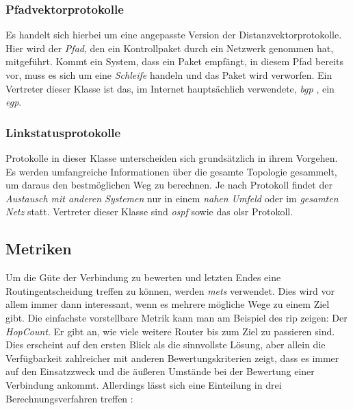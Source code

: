 \subsubsection{Pfadvektorprotokolle}

Es handelt sich hierbei um eine angepasste Version der Distanzvektorprotokolle. Hier wird der \textit{Pfad}, den ein Kontrollpaket durch ein Netzwerk genommen hat, mitgeführt. Kommt ein System, dass ein Paket empfängt, in diesem Pfad bereits vor, muss es sich um eine \textit{Schleife} handeln und das Paket wird verworfen. Ein Vertreter dieser Klasse ist das, im Internet hauptsächlich verwendete, \textit{\gls{bgp}} \cite{RFC1771}, ein \sog \textit{\gls{egp}}.

\subsubsection{Linkstatusprotokolle}

Protokolle in dieser Klasse unterscheiden sich grundsätzlich in ihrem Vorgehen. Es werden umfangreiche Informationen über die gesamte Topologie gesammelt, um daraus den bestmöglichen Weg zu berechnen. Je nach Protokoll findet der \textit{Austausch mit anderen Systemen} nur in einem \textit{nahen Umfeld} oder im \textit{gesamten Netz} statt. Vertreter dieser Klasse sind \textit{\gls{ospf}} \cite{RFC5340} sowie das \acrlong{olsr} Protokoll.

\subsection{Metriken}
\label{chapter:grundlagen:metriken}

Um die Güte der Verbindung zu bewerten und letzten Endes eine Routingentscheidung treffen zu können, werden \textit{\glspl{met}} verwendet. Dies wird vor allem immer dann interessant, wenn es mehrere mögliche Wege zu einem Ziel gibt. Die einfachste vorstellbare Metrik kann man am Beispiel des \gls{rip} zeigen: Der \textit{HopCount}. Er gibt an, wie viele weitere Router bis zum Ziel zu passieren sind. Dies erscheint auf den ersten Blick als die sinnvollste Lösung, aber allein die Verfügbarkeit zahlreicher  mit anderen Bewertungskriterien zeigt, dass es immer auf den Einsatzzweck und die äußeren Umstände bei der Bewertung einer Verbindung ankommt. Allerdings lässt sich eine Einteilung in drei Berechnungsverfahren treffen \cite{Baumann07}:

